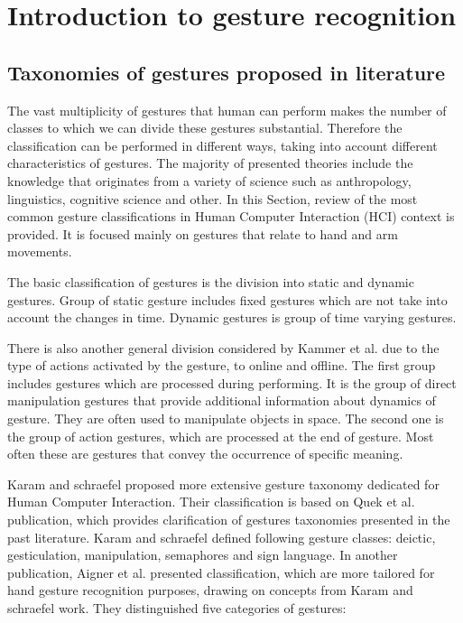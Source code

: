\chapter{Introduction to gesture recognition}

\section{Taxonomies of gestures proposed in literature}
The vast multiplicity of gestures that human can perform makes the number of classes to which we can divide these gestures substantial. Therefore the classification can be performed in different ways, taking into account different characteristics of gestures. The majority of presented theories include the knowledge that originates from a variety of science such as anthropology, linguistics, cognitive science and other. In this Section, review of the most common gesture classifications in Human Computer Interaction (HCI) context is provided. It is focused mainly on gestures that relate to hand and arm movements.

The basic classification of gestures is the division into static and dynamic gestures. Group of static gesture includes fixed gestures which are not take into account the changes in time. Dynamic gestures is group of time varying gestures.

There is also another general division considered by Kammer et al. \cite{kammer_taxonomy_2010} due to the type of actions activated by the gesture, to online and offline. The first group includes gestures which are processed during performing. It is the group of direct manipulation gestures that provide additional information about dynamics of gesture. They are often used to manipulate objects in space. The second one is the group of action gestures, which are processed at the end of gesture. Most often these are gestures that convey the occurrence of specific meaning.

Karam and schraefel \cite{Karam05ataxonomy} proposed more extensive gesture taxonomy dedicated for Human Computer Interaction. Their classification is based on Quek et al. \cite{Quek:2002:MHD:568513.568514} publication, which provides clarification of gestures taxonomies presented in the past literature. Karam and schraefel defined following gesture classes: deictic, gesticulation, manipulation, semaphores and sign language. In another publication, Aigner et al. \cite{AignerTaxonomy} presented classification, which are more tailored for hand gesture recognition purposes, drawing on concepts from Karam and schraefel work. They distinguished five categories of gestures:

